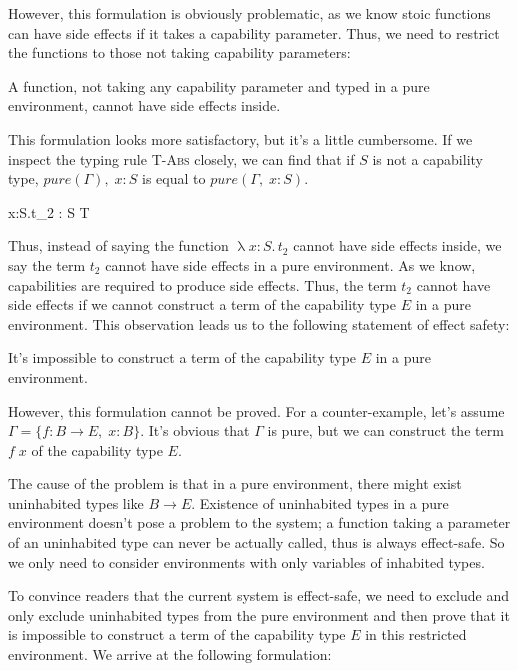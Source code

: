 However, this formulation is obviously problematic, as we know stoic
functions can have side effects if it takes a capability
parameter. Thus, we need to restrict the functions to those not taking
capability parameters:

\begin{definition}
  A function, not taking any capability parameter and typed in a pure
  environment, cannot have side effects inside.
\end{definition}

This formulation looks more satisfactory, but it's a little
cumbersome. If we inspect the typing rule \textsc{T-Abs} closely, we
can find that if $S$ is not a capability type, $pure(\Gamma),\; x: S$
is equal to $pure(\Gamma,\; x: S)$.

{ \Gamma \vdash \uplambda x{:}S.\;t_2 : S \to T }

Thus, instead of saying the function $\uplambda x{:}S.\, t_2$ cannot
have side effects inside, we say the term $t_2$ cannot have side
effects in a pure environment. As we know, capabilities are required
to produce side effects. Thus, the term $t_2$ cannot have side effects
if we cannot construct a term of the capability type $E$ in a pure
environment. This observation leads us to the following statement of
effect safety:

\begin{definition}
  It's impossible to construct a term of the capability type $E$ in a
  pure environment.
\end{definition}

However, this formulation cannot be proved.  For a counter-example,
let's assume $\Gamma = \{f: B \to E, \; x: B\}$. It's obvious that
$\Gamma$ is pure, but we can construct the term $f \; x$ of the
capability type $E$.

The cause of the problem is that in a pure environment, there might
exist uninhabited types like $B \to E$.  Existence of uninhabited
types in a pure environment doesn't pose a problem to the system; a
function taking a parameter of an uninhabited type can never be
actually called, thus is always effect-safe. So we only need to
consider environments with only variables of inhabited types.

To convince readers that the current system is effect-safe, we need to
exclude and only exclude uninhabited types from the pure environment
and then prove that it is impossible to construct a term of the
capability type $E$ in this restricted environment. We arrive at the
following formulation:

